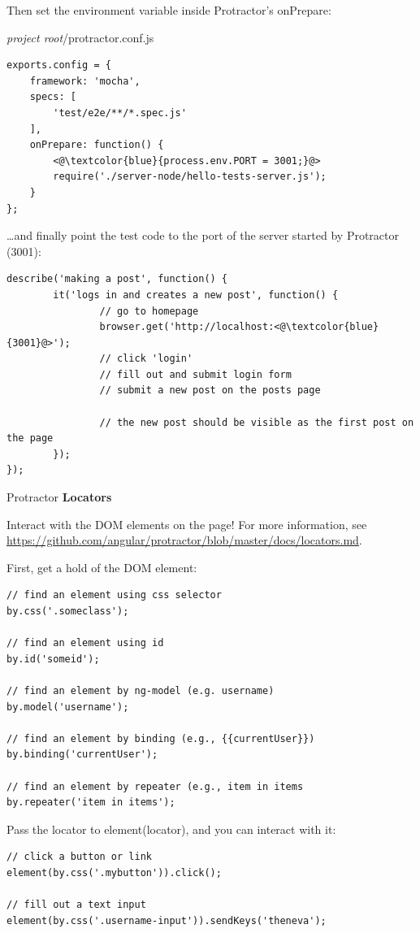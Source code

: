 \documentclass[british]{article}
\begin{document}
Then set the environment variable inside Protractor's onPrepare:

\textit{project root}/protractor.conf.js

\begin{lstlisting}
exports.config = {
    framework: 'mocha',
    specs: [
        'test/e2e/**/*.spec.js'
    ],
    onPrepare: function() {
        <@\textcolor{blue}{process.env.PORT = 3001;}@>
        require('./server-node/hello-tests-server.js');
    }
};
\end{lstlisting}

\dots and finally point the test code to the port of the server started by Protractor (3001):

\begin{lstlisting}
describe('making a post', function() {
        it('logs in and creates a new post', function() {
                // go to homepage
                browser.get('http://localhost:<@\textcolor{blue}{3001}@>');
                // click 'login'
                // fill out and submit login form
                // submit a new post on the posts page

                // the new post should be visible as the first post on the page
        });
});
\end{lstlisting}

Protractor \textbf{Locators}

Interact with the DOM elements on the page! For more information, see \url{https://github.com/angular/protractor/blob/master/docs/locators.md}.

First, get a hold of the DOM element:

\begin{lstlisting}
// find an element using css selector
by.css('.someclass');

// find an element using id
by.id('someid');

// find an element by ng-model (e.g. username)
by.model('username');

// find an element by binding (e.g., {{currentUser}})
by.binding('currentUser');

// find an element by repeater (e.g., item in items
by.repeater('item in items');
\end{lstlisting}

Pass the locator to element(locator), and you can interact with it:

\begin{lstlisting}
// click a button or link
element(by.css('.mybutton')).click();

// fill out a text input
element(by.css('.username-input')).sendKeys('theneva');
\end{lstlisting}
\end{document}
